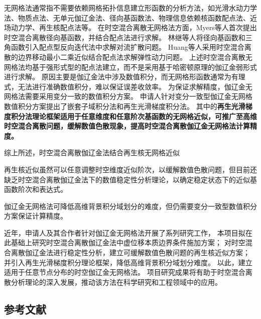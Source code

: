 无网格法通常指不需要依赖网格拓扑信息建立形函数的分析方法，如光滑水动力学法\cite{Yang2019,Chang2011}、物质点法\cite{Kan2022}、无单元伽辽金法\cite{Wu2016d,Cheng2024}、径向基函数法\cite{jiang2025}、物理信息依赖核函数配点法\cite{FuZhuoJia2022}、近场动力学\cite{Gu2016,Zhang2022}、再生核配点法\cite{Hu2023}等。
在时空混合离散无网格法方面，Myers等人\cite{myers2002}首次提出时空混合离散径向基函数，并结合配点法进行求解。
林继等人\cite{lin2021}将径向基函数和三角函数引入配点型反向迭代法中求解对流扩散问题。
Huang等人\cite{huang2024}采用时空混合离散的边界移动最小二乘近似结合配点法求解弹性动力问题。
上述时空混合离散无网格法均基于强形式型的配点法建立，而不是采用基于哈密顿原理的伽辽金弱形式进行求解。
原因主要是伽辽金法中涉及数值积分，而无网格形函数通常为有理式，无法进行准确数值积分，难以保证误差收敛率\cite{wu2021}。
为保证求解精度，伽辽金无网格法需要采用变分一致的数值积分方案\cite{Wu2016d}。
申请人针对变分一致型伽辽金无网格数值积分方案提出了嵌套子域积分法\cite{wang2016b}和再生光滑梯度积分法\cite{wang2019a}。
其中的\textbf{再生光滑梯度积分法理论框架适用于任意维度和任意阶次基函数的无网格近似，可推广至高维时空混合离散问题，缓解数值色散现象，提高时空混合离散伽辽金无网格法计算精度。}

综上所述，时空混合离散伽辽金法结合再生核无网格近似

再生核近似虽然可以任意调整时空维度近似阶次，以缓解数值色散问题，但目前还缺乏时空混合离散伽辽金法下的数值稳定性分析理论，以确定稳定状态下的近似基函数阶次和表达式。

伽辽金无网格法可降低高维背景积分域划分的难度，但仍需要变分一致型数值积分方案保证计算精度。

近年，申请人及其合作者针对伽辽金无网格法开展了系列研究工作，
本项目拟在此基础上研究时空混合离散伽辽金法中虚位移本质边界条件施加方案；
对时空混合离散伽辽金法进行稳定性分析，建立可缓解数值色散问题的再生核近似方案；
并引入再生光滑梯度积分理论框架，降低高维背景积分域划分难度。
以此，建立适用于任意节点分布的时空伽辽金无网格法。
项目研究成果将有助于时空混合离散分析理论的深入发展，推动该方法在科学研究和工程领域中的应用。


\begin{REF}
	\subsection*{参考文献}
	\vspace{-50pt}
	
\end{REF}

